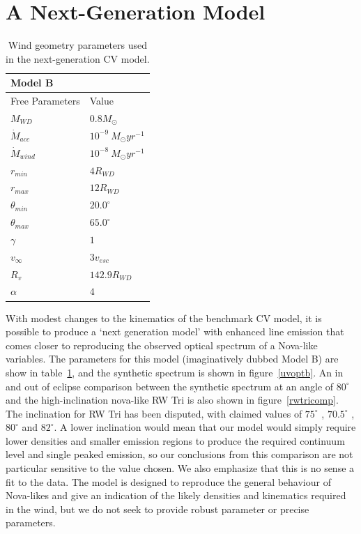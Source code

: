 \documentclass[preprint, a4paper, 11pt]{aastex}
\begin{document}
\section{A Next-Generation Model}

\begin{table}
\centering
\begin{tabular}{p{3cm}p{4cm}}
Model B \\
\hline Free Parameters 	&	 Value \\ 
\hline \hline 
$M_{WD}$ 	 &	 $0.8 M_{\odot}$ \\ 
$\dot{M}_{acc}$ 	 &	 $10^{-9}~M_{\odot}yr^{-1}$\\ 
$\dot{M}_{wind}$  &	$10^{-8}~M_{\odot}yr^{-1}$\\ 
$r_{min}$ 	&	 $4 R_{WD}$\\ 
$r_{max}$ 	&	 $12 R_{WD}$ \\ 
$\theta_{min}$ 	&	 $20.0^{\circ}$ \\ 
$\theta_{max}$ 	&	 $65.0^{\circ}$ \\ 
$\gamma$ 	&	 $1$ \\ 
$v_{\infty}$ 	&	 $3v_{esc}$ \\ 
$R_v$ 	        &	 $142.9 R_{WD}$ \\ 
$\alpha$ 	&	 $4$ \\
\end{tabular}
\centering
\caption{Wind geometry parameters used in the next-generation CV model.}
\label{modelb}
\end{table}

With modest changes to the kinematics of the benchmark CV model,
it is possible to produce a `next generation model' with enhanced
line emission that comes closer to reproducing the observed optical spectrum
of a Nova-like variables. The parameters for this model (imaginatively dubbed Model B)
are show in table~\ref{modelb}, and the synthetic spectrum
is shown in figure~\ref{uvoptb}. An in and out of eclipse comparison 
between the synthetic spectrum
at an angle of $80^\circ$ and the high-inclination nova-like RW Tri 
is also shown in figure~\ref{rwtricomp}. The inclination
for RW Tri has been disputed, with claimed values of $75^\circ$ \citep{groot2004},
$70.5^\circ$ \citep{smak1995}, $80^\circ$ \citep{longmore1981} and 
$82^\circ$\citep{frankking1981}. A lower inclination
would mean that our model would simply require lower densities 
and smaller emission regions to produce the required continuum level
and single peaked emission, so our conclusions from this comparison are
not particular sensitive to the value chosen.
We also emphasize that this is no sense a fit to the data. The model
is designed to reproduce the general behaviour of Nova-likes
and give an indication of the likely densities and kinematics 
required in the wind, but we do not seek to provide robust parameter
or precise parameters.
\end{document}

